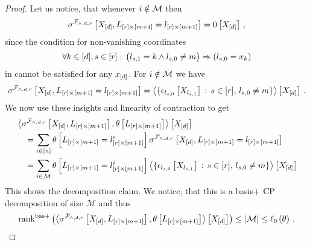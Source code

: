 \begin{proof}
    Let us notice, that whenever $i\notin\mathcal{M}$ then
    \begin{align*}
        \sigma^{\mathcal{F}_{\land,d,r}}\left[X_{[d]},L_{[r]\times[m+1]}=l_{[r]\times[m+1]}\right]
        = 0\left[X_{[d]}\right] \, ,
    \end{align*}
    since the condition for non-vanishing coordinates
    \begin{align*}
        \forall{k\in[d],s\in[r]} : \, \big(l_{s,1} = k \land l_{s,0} \neq m \big) \Rightarrow  (l_{s,0} = x_{k})
    \end{align*}
    in  cannot be satisfied for any $x_{[d]}$.
    For $i\notin\mathcal{M}$ we have
    \begin{align*}
        \sigma^{\mathcal{F}_{\land,d,r}}\left[X_{[d]},L_{[r]\times[m+1]}=l_{[r]\times[m+1]}\right]
        =  \left\langle \{\epsilon_{l_{s,0}}\left[X_{l_{s,1}}\right] \, : \, s\in[r], \, l_{s,0}\neq m \}\right\rangle \left[ X_{[d]} \right] \, .
    \end{align*}
    We now use these insights and linearity of contraction to get
    \begin{align*}
        &\left\langle \sigma^{\mathcal{F}_{\land,d,r}}\left[X_{[d]},L_{[r]\times[m+1]}\right],\theta\left[L_{[r]\times[m+1]}\right]\right\rangle \left[ X_{[d]} \right] \\
        & \quad = \sum_{i\in[n]} \theta\left[L_{[r]\times[m+1]}=l_{[r]\times[m+1]}^{i}\right]
        \sigma^{\mathcal{F}_{\land,d,r}}\left[X_{[d]},L_{[r]\times[m+1]}=l_{[r]\times[m+1]}\right] \\
        & \quad = \sum_{i\in\mathcal{M}} \theta\left[L_{[r]\times[m+1]}=l_{[r]\times[m+1]}^{i}\right]
        \left\langle \{\epsilon_{l_{s,0}}\left[X_{l_{s,1}}\right] \, : \, s\in[r], \, l_{s,0}\neq m \}\right\rangle \left[ X_{[d]} \right]
    \end{align*}
    This shows the decomposition claim.
    We notice, that this is a basis+ $\mathrm{CP}$ decomposition of size $\mathcal{M}$ and thus
    \begin{align*}
        \mathrm{rank}^{\mathrm{bas+}}\left(\left\langle \sigma^{\mathcal{F}_{\land,d,r}}\left[X_{[d]},L_{[r]\times[m+1]}\right],\theta\left[L_{[r]\times[m+1]}\right]\right\rangle \left[ X_{[d]} \right]\right)
        \leq \left|\mathcal{M}\right| \leq \ell_0\left(\theta\right) \, .
    \end{align*}
\end{proof}

